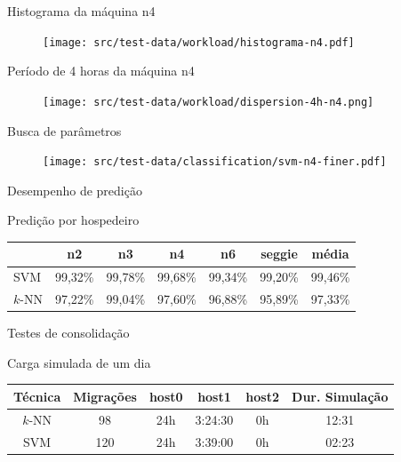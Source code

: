 \documentclass{beamer}
\begin{document}
\begin{frame}{Histograma da máquina n4}
\begin{figure}
\centering
\texttt{[image: src/test-data/workload/histograma-n4.pdf]}
\end{figure}
\end{frame}

\begin{frame}{Período de 4 horas da máquina n4}
\begin{figure}
\centering
\texttt{[image: src/test-data/workload/dispersion-4h-n4.png]}
\end{figure}
\end{frame}

\begin{frame}{Busca de parâmetros}
\begin{figure}
\centering
\texttt{[image: src/test-data/classification/svm-n4-finer.pdf]}
\end{figure}
\end{frame}

\begin{frame}{Desempenho de predição}
\begin{block}{Predição por hospedeiro}
\begin{table}
\centering
\begin{tabular}{| l | c | c | c | c | c | c |}
\hline
		& n2      & n3       & n4      	 & n6        & seggie  	 & média   \\
\hline
SVM     	& 99,32\%  & 99,78\% &   99,68\% &   99,34\% &   99,20\% & 99,46\% \\
\hline
$k$-NN  	& 97,22\%  & 99,04\% &   97,60\% &   96,88\% &   95,89\% & 97,33\% \\
\hline
\end{tabular}
\end{table}
\end{block}
\end{frame}

\begin{frame}{Testes de consolidação}
\begin{block}{Carga simulada de um dia}
\begin{table}
\centering
\begin{tabular}{| c | c | c | c | c | c |}
\hline
Técnica & Migrações & host0  & host1   & host2 & Dur. Simulação \\
\hline
$k$-NN 	& 98        & 24h    & 3:24:30 & 0h    & 12:31  \\
\hline
SVM 	& 120       & 24h    & 3:39:00 & 0h    & 02:23  \\
\hline
\end{tabular}
\end{table}
\end{block}
\end{frame}
\end{document}

